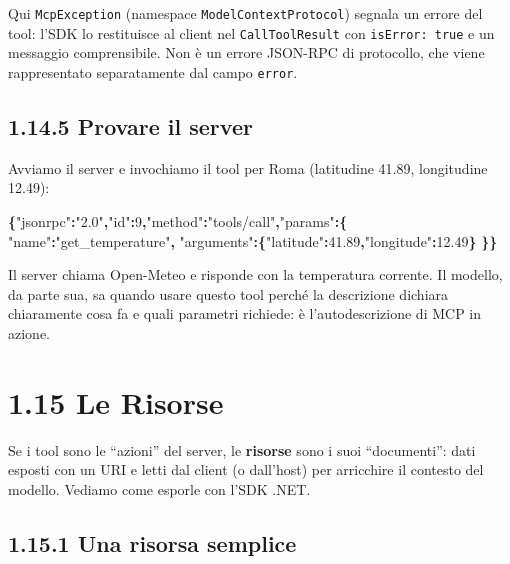 \documentclass[
  italian,
  10pt,
]{book}
\newenvironment{Shaded}{\begin{snugshade}}{\end{snugshade}}
\newcommand{\DataTypeTok}[1]{\textcolor[rgb]{0.13,0.29,0.53}{#1}}
\newcommand{\DecValTok}[1]{\textcolor[rgb]{0.00,0.00,0.81}{#1}}
\newcommand{\FloatTok}[1]{\textcolor[rgb]{0.00,0.00,0.81}{#1}}
\newcommand{\FunctionTok}[1]{\textcolor[rgb]{0.13,0.29,0.53}{\textbf{#1}}}
\newcommand{\StringTok}[1]{\textcolor[rgb]{0.31,0.60,0.02}{#1}}
\begin{document}
Qui \texttt{McpException} (namespace \texttt{ModelContextProtocol})
segnala un errore del tool: l'SDK lo restituisce al client nel
\texttt{CallToolResult} con \texttt{isError:\ true} e un messaggio
comprensibile. Non è un errore JSON-RPC di protocollo, che viene
rappresentato separatamente dal campo \texttt{error}.

\subsection{1.14.5 Provare il server}\label{provare-il-server-1}

Avviamo il server e invochiamo il tool per Roma (latitudine 41.89,
longitudine 12.49):

\begin{Shaded}
\begin{Highlighting}[]
\FunctionTok{\{}\DataTypeTok{"jsonrpc"}\FunctionTok{:}\StringTok{"2.0"}\FunctionTok{,}\DataTypeTok{"id"}\FunctionTok{:}\DecValTok{9}\FunctionTok{,}\DataTypeTok{"method"}\FunctionTok{:}\StringTok{"tools/call"}\FunctionTok{,}\DataTypeTok{"params"}\FunctionTok{:\{}
  \DataTypeTok{"name"}\FunctionTok{:}\StringTok{"get\_temperature"}\FunctionTok{,}
  \DataTypeTok{"arguments"}\FunctionTok{:\{}\DataTypeTok{"latitude"}\FunctionTok{:}\FloatTok{41.89}\FunctionTok{,}\DataTypeTok{"longitude"}\FunctionTok{:}\FloatTok{12.49}\FunctionTok{\}}
\FunctionTok{\}\}}
\end{Highlighting}
\end{Shaded}

Il server chiama Open-Meteo e risponde con la temperatura corrente. Il
modello, da parte sua, sa quando usare questo tool perché la descrizione
dichiara chiaramente cosa fa e quali parametri richiede: è
l'autodescrizione di MCP in azione.

\section{1.15 Le Risorse}\label{le-risorse}

Se i tool sono le ``azioni'' del server, le \textbf{risorse} sono i suoi
``documenti'': dati esposti con un URI e letti dal client (o dall'host)
per arricchire il contesto del modello. Vediamo come esporle con l'SDK
.NET.

\subsection{1.15.1 Una risorsa semplice}\label{una-risorsa-semplice}
\end{document}

